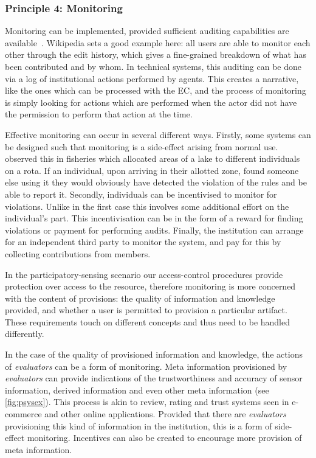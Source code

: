 \subsubsection*{Principle 4: Monitoring}

Monitoring can be implemented, provided sufficient auditing capabilities are available~\citep{Pitt2012b}. Wikipedia sets a good example here: all users are able to monitor each other through the edit history, which gives a fine-grained breakdown of what has been contributed and by whom. 
In technical systems, this auditing can be done via a log of institutional actions performed by agents. This creates a narrative, like the ones which can be processed with the \ac{EC}, and the process of monitoring is simply looking for actions which are performed when the actor did not have the permission to perform that action at the time.

Effective monitoring can occur in several different ways. 
Firstly, some systems can be designed such that monitoring is a side-effect arising from normal use. 
 observed this in fisheries which allocated areas of a lake to different individuals on a rota. 
If an individual, upon arriving in their allotted zone, found someone else using it they would obviously have detected the violation of the rules and be able to report it. 
Secondly, individuals can be incentivised to monitor for violations. Unlike in the first case this involves some additional effort on the individual's part. 
This incentivisation can be in the form of a reward for finding violations or payment for performing audits. 
Finally, the institution can arrange for an independent third party to monitor the system, and pay for this by collecting contributions from members.

In the participatory-sensing scenario our access-control procedures provide protection over access to the resource, therefore monitoring is more concerned with the content of provisions: the quality of information and knowledge provided, and whether a user is permitted to provision a particular artifact. 
These requirements touch on different concepts and thus need to be handled differently. 

In the case of the quality of provisioned information and knowledge, the actions of \emph{evaluators} can be a form of monitoring. 
Meta information provisioned by \emph{evaluators} can provide indications of the trustworthiness and accuracy of sensor information, derived information and even other meta information (see \autoref{fig:psysex}). 
This process is akin to review, rating and trust systems seen in e-commerce and other online applications. Provided that there are \emph{evaluators} provisioning this kind of information in the institution, this is a form of side-effect monitoring. 
Incentives can also be created to encourage more provision of meta information.

